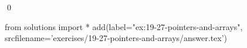 
\begin{ex}
  \label{ex:19-27-pointers-and-arrays}
  
  \qed
\end{ex}
\begin{python0}
from solutions import *
add(label="ex:19-27-pointers-and-arrays",
    srcfilename='exercises/19-27-pointers-and-arrays/answer.tex')
\end{python0}
